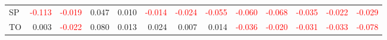 \begin{table}[!htb]
{\begin{tabular}{lrrrrrrrrrrrr}
      SP & \textcolor{red}{-0.113} & \textcolor{red}{-0.019} & 0.047 & 0.010 & \textcolor{red}{-0.014} & \textcolor{red}{-0.024} & \textcolor{red}{-0.055} & \textcolor{red}{-0.060} & \textcolor{red}{-0.068} & \textcolor{red}{-0.035} & \textcolor{red}{-0.022} & \textcolor{red}{-0.029} \\
      TO & 0.003 & \textcolor{red}{-0.022} & 0.080 & 0.013 & 0.024 & 0.007 & 0.014 & \textcolor{red}{-0.036} & \textcolor{red}{-0.020} & \textcolor{red}{-0.031} & \textcolor{red}{-0.033} & \textcolor{red}{-0.078} \\
      \hline
    \end{tabular}%
  }
  \label{tab:dem_sh}
\end{table}

